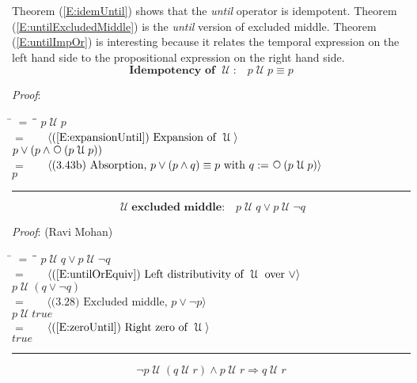 \documentclass[12pt, fleqn, leqno]{article}
\newcommand{\lgap}{2pt}                             %
\newcommand{\mymathindent}{24pt}                    %
\newcommand{\impl}{\ensuremath{\Rightarrow}}        %
\newcommand{\Until}{\;\mathcal{U}\;}
\newcommand{\Next}{\;\,\text{\raisebox{3.5pt}{\circle{6}}}}
\newcommand{\myqed}{\rule[-.23ex]{1.2ex}{2.0ex}}
\newcommand{\myqedtab}{\hspace{384pt}}              %
\newcommand{\Gll} {\langle}                         %
\newcommand{\Ggg} {\rangle}                         %
\newcommand{\Hint}[1]     {\ \ \ $\Gll              \mbox{#1} \Ggg$ }   %
\begin{document}
Theorem (\ref{E:idemUntil}) shows that the \textit{until} operator is idempotent.
Theorem (\ref{E:untilExcludedMiddle}) is the \textit{until} version of excluded middle.
Theorem (\ref{E:untilImpOr}) is interesting because it relates the temporal expression on the left hand side
to the propositional expression on the right hand side.
\begin{equation}\label{E:idemUntil}
\textbf{Idempotency of $\Until$:}\quad p \Until p \equiv p
\end{equation}

\emph{Proof}:
\begin{tabbing}
\hspace{\mymathindent} \= $= \;$ \= \myqedtab \= \kill
  \> \>   $p \Until p$\\[\lgap]
  \> $=$  \>  \Hint{(\ref{E:expansionUntil}) Expansion of $\Until$}\\[\lgap]
  \> \>   $p \lor (p \land \Next(p \Until p))$\\[\lgap]
  \> $=$  \>  \Hint{(3.43b) Absorption, $p \lor (p \land q) \equiv p$ with $q := \Next (p \Until p)$}\\[\lgap]
  \> \>   $p$ \quad \myqed
\end{tabbing}
\begin{equation}\label{E:untilExcludedMiddle}
\Until \textbf{excluded middle:}\quad p \Until q \lor p\Until \neg q
\end{equation}

\emph{Proof}: (Ravi Mohan)
\begin{tabbing}
\hspace{\mymathindent} \= $= \;$ \= \myqedtab \= \kill
\> \> $p \Until q \lor p\Until \neg q$\\[\lgap]
\> $=$  \>  \Hint{(\ref{E:untilOrEquiv}) Left distributivity of $\Until$ over $\lor$}\\[\lgap]
\> \> $p \Until (q \lor \neg q)$\\[\lgap]
\> $=$ \> \Hint{(3.28) Excluded middle, $p\lor \neg p$} \\[\lgap]
\> \> $p \Until true$\\[\lgap]
\> $=$ \> \Hint{(\ref{E:zeroUntil}) Right zero of $\Until$} \\[\lgap]
\> \> $true$ \quad \myqed
\end{tabbing}
\begin{equation}\label{E:notPUntilQUntilR}
\neg p \Until (q \Until r) \land p\Until r \impl q\Until r
\end{equation}
\end{document}
